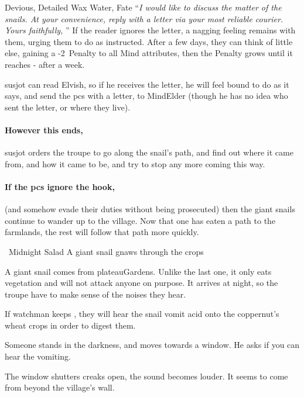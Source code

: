   {Devious, Detailed}%
  {Wax}%
  {Water, Fate}%
  {}%
  {``\textit{I would like to discuss the matter of the snails.
  At your convenience, reply with a letter via your most reliable courier.  Yours faithfully, }''}%
  {If the reader ignores the letter, a nagging feeling remains with them, urging them to do as instructed.
  After a few days, they can think of little else, gaining a -2~Penalty to all Mind \glspl{attribute}, then the Penalty grows until it  reaches - after a week.}%

\label{urgentLetter}
\showTalisman

\Gls{susjot} can read Elvish, so if he receives the letter, he will feel bound to do as it says, and send the \glspl{pc} with a letter, to \gls{MindElder} (though he has no idea who sent the letter, or where they live).

\paragraph{However this ends,}
\gls{susjot} orders the troupe to go along the snail's path, and find out where it came from, and how it came to be, and try to stop any more coming this way.

\paragraph{If the \glspl{pc} ignore the hook,}
(and somehow evade their duties without being prosecuted) then the giant snails continue to wander up to the \gls{village}.
Now that one has eaten a path to the farmlands, the rest will follow that path more quickly.

{~Midnight Salad}%
{A giant snail gnaws through the crops}%

A giant snail comes from \gls{plateauGardens}.
Unlike the last one, it only eats vegetation and will not attack anyone on purpose.
It arrives at night, so the troupe have to make sense of the noises they hear.

If  watchman keeps , they will hear the snail vomit acid onto the \gls{coppernut}'s wheat crops in order to digest them.

\begin{boxtext}
  Someone stands in the darkness, and moves towards a window.
  He asks if you can hear the vomiting.

  The window shutters creaks open, the sound becomes louder.
  It seems to come from beyond the \gls{village}'s wall.
\end{boxtext}

